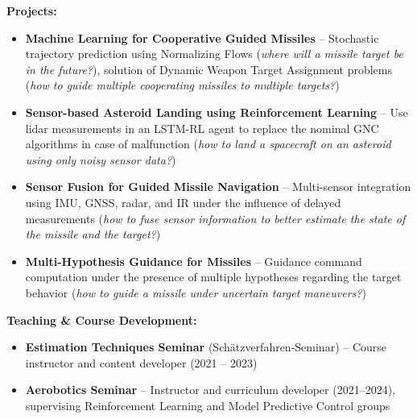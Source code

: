 \documentclass[11pt,a4paper]{article}
\begin{document}

\hspace{-0.0em}\textbf{Projects:}


\begin{itemize}[leftmargin=1.0cm]
    \item \textbf{Machine Learning for Cooperative Guided Missiles} -- Stochastic trajectory prediction using Normalizing Flows (\textit{where will a missile target be in the future?}), solution of Dynamic Weapon Target Assignment problems (\textit{how to guide multiple cooperating missiles to multiple targets?})

    \item \textbf{Sensor-based Asteroid Landing using Reinforcement Learning} -- Use lidar measurements in an LSTM-RL agent to replace the nominal GNC algorithms in case of malfunction (\textit{how to land a spacecraft on an asteroid using only noisy sensor data?})

    \item \textbf{Sensor Fusion for Guided Missile Navigation} -- Multi-sensor integration using IMU, GNSS, radar, and IR under the influence of delayed measurements (\textit{how to fuse sensor information to better estimate the state of the missile and the target?})

    \item \textbf{Multi-Hypothesis Guidance for Missiles} -- Guidance command computation under the presence of multiple hypotheses regarding the target behavior (\textit{how to guide a missile under uncertain target maneuvers?})
\end{itemize}

\hspace{0.0em}\textbf{Teaching \& Course Development:}
\begin{itemize}[leftmargin=1.0cm]
    \item \textbf{Estimation Techniques Seminar} (Schätzverfahren-Seminar) -- Course instructor and content developer (2021 -- 2023)
    \item \textbf{Aerobotics Seminar} -- Instructor and curriculum developer (2021--2024), supervising Reinforcement Learning and Model Predictive Control groups
\end{itemize}
\end{document}

